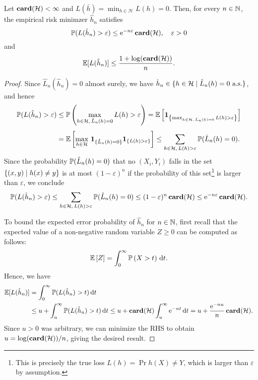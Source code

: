 \begin{theorem}
Let $\card{\mathcal{H}} < \infty$ and $L(\bar h) = \min_{h \in \mathcal{H}} L(h) = 0$. Then, for every $n \in \N$, the empirical risk minimzer $\hat h_n$ satisfies
\[
    \P(L(\hat h_n) > \varepsilon) \leq \e^{-n \varepsilon} \, \card{\mathcal{H}}, \quad \varepsilon > 0
\]
and
\[
    \ex{L(\hat h_n)} \leq \frac{1 + \log(\card{\mathcal{H}})}{n}.
\]
\end{theorem}

\begin{proof}
Since $\hat L_n(\hat h_n) = 0$ almost surely, we have $\hat h_n \in \{h \in \mathcal{H} \with \hat L_n(h) = 0 \text{ a.s.}\}$, and hence
\begin{align*}
    \P(L(\hat h_n) > \varepsilon) &\leq \Pr{\max_{h \in \mathcal{H}, \, \hat L_n(h) = 0} L(h) > \varepsilon} = \Ex{\indSet{\max_{h \in \mathcal{H}, \, \hat L_n(h) = 0} L(h) > \varepsilon}} \\[4pt]
        &=\Ex{\max_{h\in\mathcal{H}} \, \mathbf{1}_{\{\hat L_n(h) = 0\}} \indSet{L(h) > \varepsilon}} \leq \sum_{h\in\mathcal{H}, \, L(h) > \varepsilon} \P(\hat L_n(h) = 0).
\end{align*}
Since the probability $\P(\hat L_n(h) = 0)$ that no $(X_i, Y_i)$ falls in the set $\set{(x, y) \with h(x) \neq y}$ is at most $(1 - \varepsilon)^n$ if the probability of this set\footnote{This is precisely the true loss $L(h) = \Pr{h(X) \neq Y}$, which is larger than $\varepsilon$ by assumption.} is larger than $\varepsilon$, we conclude
\[
    \P(L(\hat h_n) > \varepsilon) \leq \sum_{h\in\mathcal{H}, \, L(h) > \varepsilon} \P(\hat L_n(h) = 0) \leq (1 - \varepsilon)^n \, \card{\mathcal{H}} \leq \e^{-n \varepsilon} \, \card{\mathcal{H}}.
\]

To bound the expected error probability of $\hat h_n$ for $n \in \N$, first recall that the expected value of a non-negative random variable $Z \geq 0$ can be computed as follows:
\[
    \Ex{Z} = \int_0^\infty \Pr{X > t} \dt.
\]
Hence, we have
\begin{align*}
    \ex{L(\hat h_n)} &= \int_0^\infty \P(L(\hat h_n) > t) \dt \\
        &\leq u + \int_u^\infty \P(L(\hat h_n) > t) \dt \leq u + \card{\mathcal{H}} \int_u^\infty \e^{-nt} \dt = u + \frac{\e^{-nu}}{n} \, \card{\mathcal{H}}.
\end{align*}
Since $u > 0$ was arbitrary, we can minimize the RHS to obtain $u = \log(\card{\mathcal{H}}) / n$, giving the desired result.
\end{proof}
